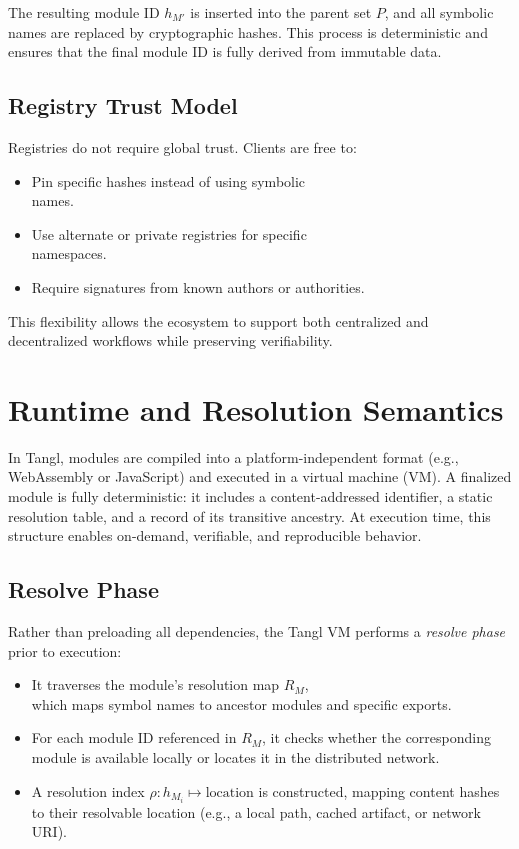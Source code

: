 \documentclass[sigplan,screen]{acmart}
\begin{document}
The resulting module ID $h_{M'}$ is inserted into the parent set $P$, and all symbolic names are replaced by cryptographic hashes. This process is deterministic and ensures that the final module ID is fully derived from immutable data.

\subsection{Registry Trust Model}

Registries do not require global trust. Clients are free to:
\begin{itemize}
    \item Pin specific hashes instead of using symbolic \\names.
    \item Use alternate or private registries for specific \\namespaces.
    \item Require signatures from known authors or authorities.
\end{itemize}

This flexibility allows the ecosystem to support both centralized and decentralized workflows while preserving verifiability.

\section{Runtime and Resolution Semantics}
\label{sec:runtime-resolution-semantics}

In Tangl, modules are compiled into a platform-indep\-endent format (e.g., WebAssembly or JavaScript) and executed in a virtual machine (VM). A finalized module is fully deterministic: it includes a content-addressed identifier, a static resolution table, and a record of its transitive ancestry. At execution time, this structure enables on-demand, verifiable, and reproducible behavior.

\subsection{Resolve Phase}

Rather than preloading all dependencies, the Tangl VM performs a \emph{resolve phase} prior to execution:

\begin{itemize}
    \item It traverses the module's resolution map $R_M$, \\which maps symbol names to ancestor modules and specific exports.
    \item For each module ID referenced in $R_M$, it checks whether the corresponding module is available locally or locates it in the distributed network.
    \item A resolution index $\rho: h_{M_i} \mapsto \text{location}$ is constructed, mapping content hashes to their resolvable location (e.g., a local path, cached artifact, or network URI).
\end{itemize}
\end{document}
